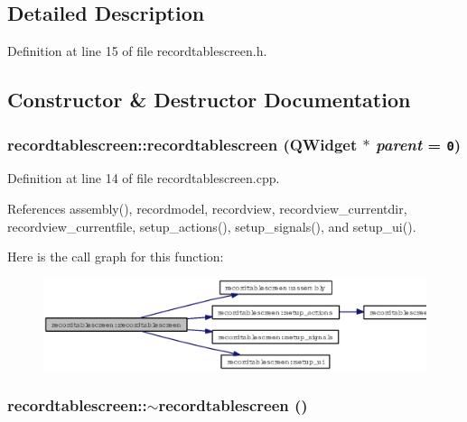 \subsection{Detailed Description}




Definition at line 15 of file recordtablescreen.h.

\subsection{Constructor \& Destructor Documentation}
\subsubsection{\setlength{\rightskip}{0pt plus 5cm}recordtablescreen::recordtablescreen (QWidget $\ast$ {\em parent} = {\tt 0})}\label{classrecordtablescreen_2542f57dfdd42389520d5f7d6963493f}




Definition at line 14 of file recordtablescreen.cpp.

References assembly(), recordmodel, recordview, recordview\_\-currentdir, recordview\_\-currentfile, setup\_\-actions(), setup\_\-signals(), and setup\_\-ui().

Here is the call graph for this function:\begin{figure}[H]
\begin{center}
\leavevmode
\includegraphics[width=359pt]{classrecordtablescreen_2542f57dfdd42389520d5f7d6963493f_cgraph}
\end{center}
\end{figure}
\subsubsection{\setlength{\rightskip}{0pt plus 5cm}recordtablescreen::$\sim$recordtablescreen ()\hspace{0.3cm}{\tt  [virtual]}}\label{classrecordtablescreen_832d2a50320b57218eaa071b4692eb7f}




